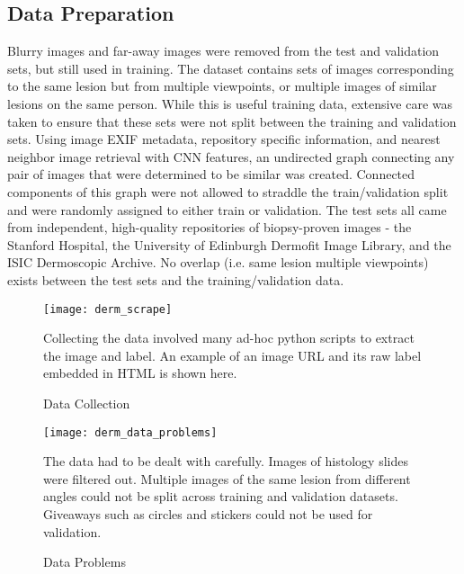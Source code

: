 \subsection{Data Preparation}
Blurry images and far-away images were removed from the test and validation sets, but still used in training. The dataset contains sets of images corresponding to the same lesion but from multiple viewpoints, or multiple images of similar lesions on the same person. While this is useful training data, extensive care was taken to ensure that these sets were not split between the training and validation sets. Using image EXIF metadata, repository specific information, and nearest neighbor image retrieval with CNN features, an undirected graph connecting any pair of images that were determined to be similar was created. Connected components of this graph were not allowed to straddle the train/validation split and were randomly assigned to either train or validation. The test sets all came from independent, high-quality repositories of biopsy-proven images - the Stanford Hospital, the University of Edinburgh Dermofit Image Library, and the ISIC Dermoscopic Archive. No overlap (i.e. same lesion multiple viewpoints) exists between the test sets and the training/validation data.

\begin{figure}
\texttt{[image: derm\_scrape]}
\caption{Data Collection}
\vspace{12px}
Collecting the data involved many ad-hoc python scripts to extract the image and label.  An example of an image URL and its raw label embedded in HTML is shown here.
\label{fig:derm_scrape}
\end{figure}

\begin{figure}
\texttt{[image: derm\_data\_problems]}
\caption{Data Problems}
\vspace{12px}
The data had to be dealt with carefully.  Images of histology slides were filtered out.  Multiple images of the same lesion from different angles could not be split across training and validation datasets.  Giveaways such as circles and stickers could not be used for validation.
\label{fig:derm_data_problems}
\end{figure}

